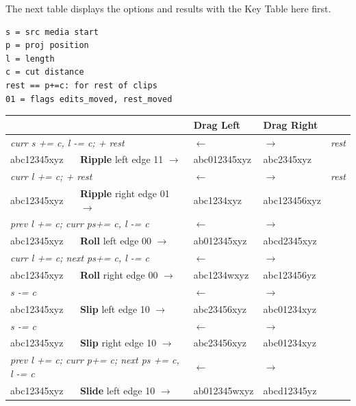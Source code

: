 The next table displays the options and results
with the Key Table here first.

\begin{lstlisting}[style=sh]
s = src media start
p = proj position
l = length
c = cut distance
rest == p+=c: for rest of clips
01 = flags edits_moved, rest_moved
\end{lstlisting}

\renewcommand{\arraystretch}{1.15}
\begin{center}
		\begin{longtable}{lllll}
			\toprule
			&  & \textbf{Drag Left} & \textbf{Drag Right} &\\
			\midrule
			\multicolumn{2}{l}{\textit{curr s += c, l -= c; + rest}} & $\leftarrow$ & $\rightarrow$ & \textit{rest}\\
			abc12345xyz & \textbf{Ripple} left edge 11 $\rightarrow$ & abc012345xyz & abc2345xyz &\\
			\midrule
			\multicolumn{2}{l}{\textit{curr l += c; + rest}} & $\leftarrow$ & $\rightarrow$ & \textit{rest}\\
			abc12345xyz & \textbf{Ripple} right edge 01 $\rightarrow$ & abc1234xyz & abc123456xyz &\\
			\midrule
			\multicolumn{2}{l}{\textit{prev l += c; curr ps+= c, l -= c}} & $\leftarrow$ & $\rightarrow$ &\\
			abc12345xyz & \textbf{Roll} left edge 00 $\rightarrow$ & ab012345xyz & abcd2345xyz &\\
			\midrule
			\multicolumn{2}{l}{\textit{curr l += c; next ps+= c, l -= c}} & $\leftarrow$ & $\rightarrow$ &\\
			abc12345xyz & \textbf{Roll} right edge 00 $\rightarrow$ & abc1234wxyz & abc123456yz &\\
			\midrule
			\multicolumn{2}{l}{\textit{s -= c}} & $\leftarrow$ & $\rightarrow$ &\\
			abc12345xyz & \textbf{Slip} left edge 10 $\rightarrow$ & abc23456xyz & abc01234xyz &\\
			\midrule
			\multicolumn{2}{l}{\textit{s -= c}} & $\leftarrow$ & $\rightarrow$ &\\
			abc12345xyz & \textbf{Slip} right edge 10 $\rightarrow$ & abc23456xyz & abc01234xyz &\\
			\midrule
			\multicolumn{2}{l}{\textit{prev l += c; curr p+= c; next ps += c, l -= c}} & $\leftarrow$ & $\rightarrow$ &\\
			abc12345xyz & \textbf{Slide} left edge 10 $\rightarrow$ & ab012345wxyz & abcd12345yz &\\

\end{longtable}
\end{center}
